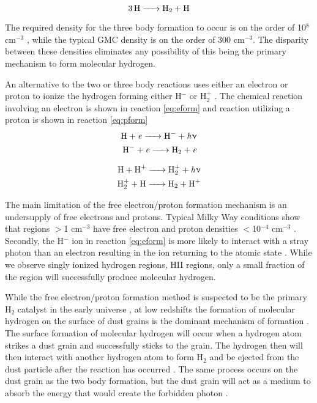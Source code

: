 \begin{equation}\label{eq:3bod}
  \ce{3H -> H_2 + H}
\end{equation}

The required density for the three body formation to occur is on the order of 10$^8$ cm$^{-3}$ \citep{palla1983,abel1997}, while the typical GMC density is on the order of 300 cm$^{-3}$.  The disparity between these densities eliminates any possibility of this being the primary mechanism to form molecular hydrogen. 

An alternative to the two or three body reactions uses either an electron or proton to ionize the hydrogen forming either H$^-$ or H$_2^+$ \citep{krumholz2014}.  The chemical reaction involving an electron is shown in reaction \ref{eq:eform} and reaction utilizing a proton is shown in reaction \ref{eq:pform}
\begin{equation}\label{eq:eform}
  \begin{split}
    \ce{H + \it{e} -> H^- + \it{h\nu}} \\
    \ce{H^- + \it{e} -> H_2 + \it{e}}
  \end{split}
\end{equation}

\begin{equation}\label{eq:pform}
  \begin{split}
    \ce{H + H^+ -> H^+_2 + \it{h\nu}} \\
    \ce{H^+_2 + H -> H_2 + H^+}
  \end{split}
\end{equation}

The main limitation of the free electron/proton formation mechanism is an undersupply of free electrons and protons.  Typical Milky Way conditions show that regions $>$1 cm$^{-3}$ have free electron and proton densities $<$10$^{-4}$ cm$^{-3}$ \citep{wolfire2003}.  Secondly, the H$^-$ ion in reaction \ref{eq:eform} is more likely to interact with a stray photon than an electron resulting in the ion returning to the atomic state \citep{glover2003}.  While we observe singly ionized hydrogen regions, HII regions, only a small fraction of the region will successfully produce molecular hydrogen.

While the free electron/proton formation method is suspected to be the primary H$_2$ catalyst in the early universe \citep{herbst2005}, at low redshifts the formation of molecular hydrogen on the surface of dust grains is the dominant mechanism of formation \citep{krumholz2014}.  The surface formation of molecular hydrogen will occur when a hydrogen atom strikes a dust grain and successfully sticks to the grain.  The hydrogen then will then interact with another hydrogen atom to form H$_2$ and be ejected from the dust particle after the reaction has occurred \citep{pirronello1997}.  The same process occurs on the dust grain as the two body formation, but  the dust grain will act as a medium to absorb the energy that would create the forbidden photon \citep{krumholz2014}.

